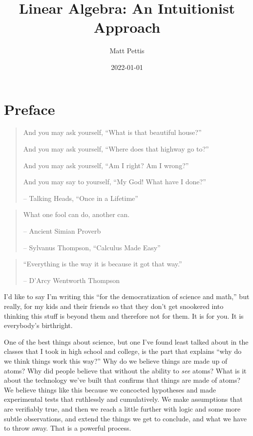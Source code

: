 \documentclass[
]{book}
\title{Linear Algebra: An Intuitionist Approach}
\author{Matt Pettis}
\date{2022-01-01}
\begin{document}
\maketitle

{
\setcounter{tocdepth}{1}
\tableofcontents
}
\hypertarget{preface}{%
\chapter{Preface}\label{preface}}

\begin{quote}
And you may ask yourself, ``What is that beautiful house?''

And you may ask yourself, ``Where does that highway go to?''

And you may ask yourself, ``Am I right? Am I wrong?''

And you may say to yourself, ``My God! What have I done?''

-- Talking Heads, ``Once in a Lifetime''
\end{quote}

\begin{quote}
What one fool can do, another can.

-- Ancient Simian Proverb

-- Sylvanus Thompson, ``Calculus Made Easy''
\end{quote}

\begin{quote}
``Everything is the way it is because it got that way.''

-- D'Arcy Wentworth Thompson
\end{quote}

I'd like to say I'm writing this ``for the democratization of science and math,'' but really, for my kids and their friends so that they don't get snookered into thinking this stuff is beyond them and therefore not for them. It is for you. It is everybody's birthright.

One of the best things about science, but one I've found least talked about in the classes that I took in high school and college, is the part that explains ``why do we think things work this way?'' Why do we believe things are made up of atoms? Why did people believe that without the ability to \emph{see} atoms? What is it about the technology we've built that confirms that things are made of atoms? We believe things like this because we concocted hypotheses and made experimental tests that ruthlessly and cumulatively. We make assumptions that are verifiably true, and then we reach a little further with logic and some more subtle observations, and extend the things we get to conclude, and what we have to throw away. That is a powerful process.
\end{document}
